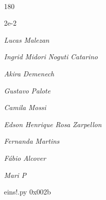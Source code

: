 \documentclass[12pt]{article}
\begin{document}
	\hfill	  	  


\pagebreak			

	\ 
	\vfill
	\begin{turn}{180}	
		\begin{minipage}{\textwidth}
		  	\ttfamily %
			\centering
			{\Huge 2e-2}
		  
			\hfill
		  
			

\textit{\small Lucas Malezan}

\textit{\small Ingrid Midori Noguti Catarino}

\textit{\small Akira Demenech}

\textit{\small Gustavo Palote}

\textit{\small Camila Mossi}

\textit{\small Edson Henrique Rosa Zarpellon}

\textit{\small Fernanda Martins}

\textit{\small Fábio Alcover}

\textit{\small Mari P}

\bigskip

eins!.py
0x002b


		\end{minipage}	
	\end{turn}
	\vfill
	\

\pagebreak
\end{document}
